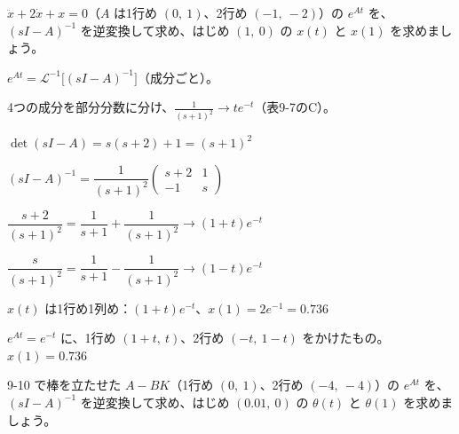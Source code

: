 \begin{reidai}[ちょうどゆれない動き]
$\ddot x+2\dot x+x=0$（$A$ は1行め $(0,\ 1)$、2行め $(-1,\ -2)$）の $e^{At}$ を、$(sI-A)^{-1}$ を逆変換して求め、はじめ $(1,\ 0)$ の $x(t)$ と $x(1)$ を求めましょう。\par
\kangaekata {}\par
{}\enspace $e^{At}=\mathcal L^{-1}\bigl[(sI-A)^{-1}\bigr]$（成分ごと）。\par
{}\enspace 4つの成分を部分分数に分け、$\frac{1}{(s+1)^2}\to te^{-t}$（表9-7のC）。\par
\shiki\kixls{}\zw{} $\det(sI-A)=s(s+2)+1=(s+1)^2$\par
\kixla $(sI-A)^{-1}=\dfrac{1}{(s+1)^2}\begin{pmatrix}s+2&1\\-1&s\end{pmatrix}$\par
\kixla $\dfrac{s+2}{(s+1)^2}=\dfrac{1}{s+1}+\dfrac{1}{(s+1)^2}\to(1+t)e^{-t}$\par
\kixla $\dfrac{s}{(s+1)^2}=\dfrac{1}{s+1}-\dfrac{1}{(s+1)^2}\to(1-t)e^{-t}$\par
\kixla $x(t)$ は1行め1列め：$(1+t)e^{-t}$、$x(1)=2e^{-1}=0.736$\par
\kotae $e^{At}=e^{-t}$ に、1行め $(1+t,\ t)$、2行め $(-t,\ 1-t)$ をかけたもの。$x(1)=0.736$
\end{reidai}

\begin{jibun}
9-10 で棒を立たせた $A-BK$（1行め $(0,\ 1)$、2行め $(-4,\ -4)$）の $e^{At}$ を、$(sI-A)^{-1}$ を逆変換して求め、はじめ $(0.01,\ 0)$ の $\theta(t)$ と $\theta(1)$ を求めましょう。
\end{jibun}

